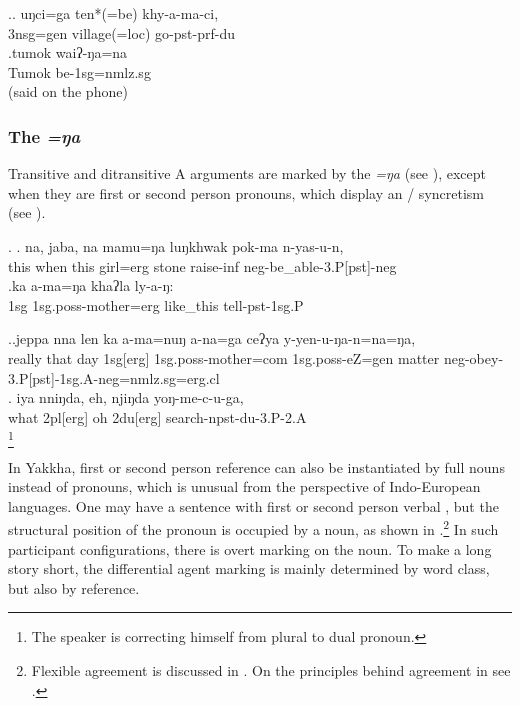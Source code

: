 	\ex.\ag. uŋci=ga    ten*(=be)        khy-a-ma-ci,\\
	{\sc 3nsg=gen} village{\sc *(=loc)}  go{\sc -pst-prf-du}		\\
	 	
	\bg.tumok waiʔ-ŋa=na\\
Tumok{\sc [loc]} be{\sc [npst]-1sg=nmlz.sg}\\
 (said on the phone)	
		
\subsubsection{The  \emph{=ŋa}}\label{case-erg}

Transitive and ditransitive A arguments are marked by the  \emph{=ŋa} (see \Next), except when they are first or second person pronouns, which display an / syncretism (see \NNext). 

	\ex. \ag. na,   jaba,   na   mamu=ŋa   luŋkhwak pok-ma        n-yas-u-n, \\
	this when this girl{\sc =erg} stone raise{\sc -inf}  {\sc neg-}be\_able{\sc -3.P[pst]-neg}\\
	\bg.ka  a-ma=ŋa                khaʔla   ly-a-ŋ: \\
	{\sc  1sg} {\sc 1sg.poss-}mother{\sc =erg} like\_this tell{\sc [3sg.A]-pst-1sg.P}\\

	
	\ex.\ag.jeppa nna  len ka       a-ma=nuŋ                a-na=ga     ceʔya y-yen-u-ŋa-n=na=ŋa, \\
	really that day {\sc 1sg[erg]} {\sc 1sg.poss-}mother{\sc =com} {\sc 1sg.poss-}eZ{\sc =gen} matter {\sc neg-}obey{\sc -3.P[pst]-1sg.A-neg=nmlz.sg=erg.cl}\\ 
\bg. iya nniŋda, eh,    njiŋda  yoŋ-me-c-u-ga,\\
what {\sc 2pl[erg]} oh {\sc 2du[erg]} search{\sc -npst-du-3.P-2.A}\\
\footnote{The speaker is correcting himself from plural to dual pronoun.} 
	
	
In Yakkha, first or second person reference can also be instantiated by full nouns instead of pronouns, which is unusual from the perspective of Indo-European languages. One may have a sentence with first or second person verbal , but the structural position of the pronoun is occupied by a noun, as shown in \Next.\footnote{Flexible agreement is discussed in . On the principles behind agreement in  see  \citet{Bickel2000On-the-syntax}.} In such participant configurations, there is overt  marking on the noun. To make a long story short, the differential agent marking is mainly determined  by word class, but also by reference.
	
